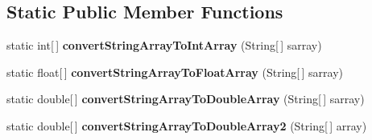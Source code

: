 \subsection*{Static Public Member Functions}
\begin{DoxyCompactItemize}
\item 
\hypertarget{classuk_1_1ac_1_1dmu_1_1iesd_1_1cascade_1_1util_1_1_array_utils_a036cc68e55f1302150e386c9cdff7c85}{static int\mbox{[}$\,$\mbox{]} {\bfseries convert\-String\-Array\-To\-Int\-Array} (String\mbox{[}$\,$\mbox{]} sarray)}\label{classuk_1_1ac_1_1dmu_1_1iesd_1_1cascade_1_1util_1_1_array_utils_a036cc68e55f1302150e386c9cdff7c85}

\item 
\hypertarget{classuk_1_1ac_1_1dmu_1_1iesd_1_1cascade_1_1util_1_1_array_utils_a7e1accb1fe62069b87f64ecb1791907b}{static float\mbox{[}$\,$\mbox{]} {\bfseries convert\-String\-Array\-To\-Float\-Array} (String\mbox{[}$\,$\mbox{]} sarray)}\label{classuk_1_1ac_1_1dmu_1_1iesd_1_1cascade_1_1util_1_1_array_utils_a7e1accb1fe62069b87f64ecb1791907b}

\item 
\hypertarget{classuk_1_1ac_1_1dmu_1_1iesd_1_1cascade_1_1util_1_1_array_utils_a1045638b0a34a93dee484456d6ad4bf6}{static double\mbox{[}$\,$\mbox{]} {\bfseries convert\-String\-Array\-To\-Double\-Array} (String\mbox{[}$\,$\mbox{]} sarray)}\label{classuk_1_1ac_1_1dmu_1_1iesd_1_1cascade_1_1util_1_1_array_utils_a1045638b0a34a93dee484456d6ad4bf6}

\item 
\hypertarget{classuk_1_1ac_1_1dmu_1_1iesd_1_1cascade_1_1util_1_1_array_utils_a107aa42085613ee0a85fe13b960e93cd}{static double\mbox{[}$\,$\mbox{]} {\bfseries convert\-String\-Array\-To\-Double\-Array2} (String\mbox{[}$\,$\mbox{]} array)}\label{classuk_1_1ac_1_1dmu_1_1iesd_1_1cascade_1_1util_1_1_array_utils_a107aa42085613ee0a85fe13b960e93cd}


\end{DoxyCompactItemize}
